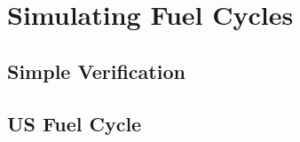 \chapter[Simulating Fuel Cycles]{Simulating Fuel Cycles}
\section{Simple Verification}

\section{US Fuel Cycle}